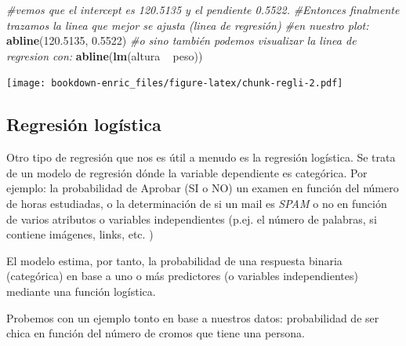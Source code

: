 \documentclass[]{book}
\newenvironment{Shaded}{\begin{snugshade}}{\end{snugshade}}
\newcommand{\KeywordTok}[1]{\textcolor[rgb]{0.13,0.29,0.53}{\textbf{{#1}}}}
\newcommand{\DataTypeTok}[1]{\textcolor[rgb]{0.13,0.29,0.53}{{#1}}}
\newcommand{\FloatTok}[1]{\textcolor[rgb]{0.00,0.00,0.81}{{#1}}}
\newcommand{\StringTok}[1]{\textcolor[rgb]{0.31,0.60,0.02}{{#1}}}
\newcommand{\CommentTok}[1]{\textcolor[rgb]{0.56,0.35,0.01}{\textit{{#1}}}}
\newcommand{\NormalTok}[1]{{#1}}
\theoremstyle{definition}
\theoremstyle{definition}
\theoremstyle{remark}
\begin{document}
\begin{Shaded}
\begin{Highlighting}[]
\CommentTok{#vemos que el intercept es 120.5135 y el pendiente 0.5522. }
\CommentTok{#Entonces finalmente trazamos la linea que mejor se ajusta (linea de regresión) }
\CommentTok{#en nuestro plot:}
\KeywordTok{abline}\NormalTok{(}\FloatTok{120.5135}\NormalTok{, }\FloatTok{0.5522}\NormalTok{)}
\CommentTok{#o sino también podemos visualizar la linea de regresion con:}
\KeywordTok{abline}\NormalTok{(}\KeywordTok{lm}\NormalTok{(altura ~}\StringTok{ }\NormalTok{peso))}
\end{Highlighting}
\end{Shaded}

\texttt{[image: bookdown-enric\_files/figure-latex/chunk-regli-2.pdf]}

\subsection{Regresión logística}\label{regresion-logistica}

Otro tipo de regresión que nos es útil a menudo es la regresión
logística. Se trata de un modelo de regresión dónde la variable
dependiente es categórica. Por ejemplo: la probabilidad de Aprobar (SI o
NO) un examen en función del número de horas estudiadas, o la
determinación de si un mail es \emph{SPAM} o no en función de varios
atributos o variables independientes (p.ej. el número de palabras, si
contiene imágenes, links, etc. )

El modelo estima, por tanto, la probabilidad de una respuesta binaria
(categórica) en base a uno o más predictores (o variables
independientes) mediante una función logística.

Probemos con un ejemplo tonto en base a nuestros datos: probabilidad de
ser chica en función del número de cromos que tiene una persona.

\begin{Shaded}
\end{Shaded}
\end{document}
